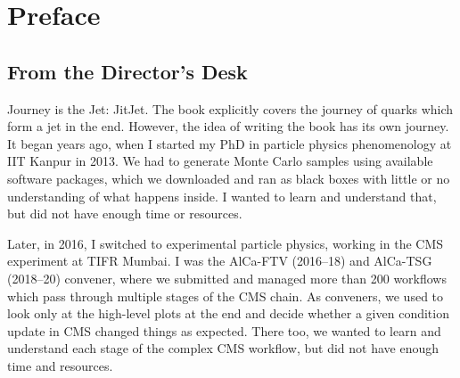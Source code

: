 \chapter{Preface}
\label{ch:preface}

\begingroup
\setlength{\parindent}{0pt}
\setlength{\parskip}{0.7\baselineskip plus 1pt minus 1pt}
\providecommand{\deskclose}[1]{\par\smallskip{\raggedleft #1\par}}

\section*{From the Director's Desk}

Journey is the Jet: JitJet. The book explicitly covers the journey of quarks which form a jet in the end. However, the idea of writing the book has its own journey. It began years ago, when I started my PhD in particle physics phenomenology at IIT Kanpur in 2013. We had to generate Monte Carlo samples using available software packages, which we downloaded and ran as black boxes with little or no understanding of what happens inside. I wanted to learn and understand that, but did not have enough time or resources.

Later, in 2016, I switched to experimental particle physics, working in the CMS experiment at TIFR Mumbai. I was the AlCa-FTV (2016--18) and AlCa-TSG (2018--20) convener, where we submitted and managed more than 200 workflows which pass through multiple stages of the CMS chain. As conveners, we used to look only at the high-level plots at the end and decide whether a given condition update in CMS changed things as expected. There too, we wanted to learn and understand each stage of the complex CMS workflow, but did not have enough time and resources.

